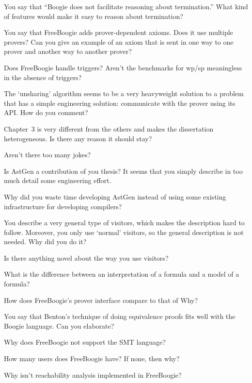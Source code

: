 \Q You say that ``Boogie does not facilitate reasoning about termination.''
What kind of features would make it easy to reason about termination?

\Q You say that FreeBoogie adds prover-dependent axioms. Does it use
multiple provers? Can you give an example of an axiom that is sent in one
way to one prover and another way to another prover?

\Q Does FreeBoogie handle triggers? Aren't the benchmarks for wp/sp
meaningless in the absence of triggers?

\Q The `unsharing' algorithm seems to be a very heavyweight solution to a
problem that has a simple engineering solution: communicate with the prover
using its API. How do you comment?

\Q Chapter~3 is very different from the others and makes the dissertation
heterogeneous. Is there any reason it should stay?

\Q Aren't there too many jokes?

\Q Is AstGen a contribution of you thesis? It seems that you simply
describe in too much detail some engineering effort.


\Q Why did you waste time developing AstGen instead of using some existing
infrastructure for developing compilers?

\Q You describe a very general type of visitors, which makes the
description hard to follow. Moreover, you only use `normal' visitors, so
the general description is not needed. Why did you do it?

\Q Is there anything novel about the way you use visitors?

\Q What is the difference between an interpretation of a formula and a
model of a formula?

\Q How does FreeBoogie's prover interface compare to that of Why?

\Q You say that Benton's technique of doing equivalence proofs fits well
with the Boogie language. Can you elaborate?

\Q Why does FreeBoogie not support the SMT language?


\Q How many users does FreeBoogie have? If none, then why?

\Q Why isn't reachability analysis implemented in FreeBoogie?

